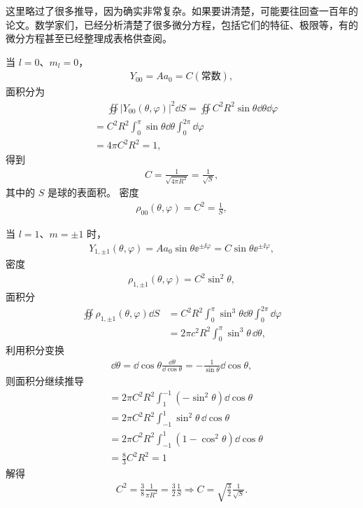 这里略过了很多推导，因为确实非常复杂。如果要讲清楚，可能要往回查一百年的论文。数学家们，已经分析清楚了很多微分方程，包括它们的特征、极限等，有的微分方程甚至已经整理成表格供查阅。

当 $l=0$、$m_l = 0$，
\begin{align}
    Y_{00} = A a_0 = C (\text{常数}),
\end{align}
面积分为
\begin{align}
    &\phantom{=}\oiint |Y_{00}(\theta, \varphi)|^2 \dd S 
    = \oiint C^2 R^2 \sin\theta \dd\theta \dd\varphi\\
    &= C^2 R^2 \int_0^\pi \sin\theta \dd\theta \int_0^{2\pi} \dd\varphi \\
    &= 4 \pi C^2 R^2 = 1, 
\end{align}
得到
\begin{align}
    C = \frac1{\sqrt{4\pi R^2}} = \frac1{\sqrt S},
\end{align}
其中的 $S$ 是球的表面积。
密度
\begin{align}
    \rho_{00}(\theta, \varphi) = C^2 = \frac1S,
\end{align}

当 $l=1$、$m=\pm1$ 时，
\begin{align}
    Y_{1,\pm1}(\theta, \varphi) = A a_0 \sin\theta \ee^{\pm\ii\varphi} = C \sin\theta \ee^{\pm\ii\varphi},
\end{align}
密度
\begin{align}
    \rho_{1,\pm1} (\theta, \varphi) = C^2 \sin^2\theta, 
\end{align}
面积分
\begin{align}
    \oiint \rho_{1,\pm1} (\theta, \varphi) \dd S 
    &= C^2 R^2 \int_0^\pi \sin^3\theta \dd\theta \int_0^{2\pi} \dd\varphi \\
    &= 2\pi c^2 R^2 \int_0^\pi \sin^3\theta \,\dd\theta,
\end{align}
利用积分变换
\begin{align}
    \dd\theta = \dd\cos\theta \frac{\dd\theta}{\dd\cos\theta} = -\frac{1}{\sin\theta} \dd\cos\theta,
\end{align}
则面积分继续推导
\begin{align}
    &= 2\pi C^2R^2 \int_1^{-1} (-\sin^2\theta)\dd\cos\theta \\
    &= 2\pi C^2R^2 \int_{-1}^{1} \sin^2\theta\,\dd\cos\theta \\
    &= 2\pi C^2 R^2 \int_{-1}^1 (1-\cos^2\theta) \dd\cos\theta\\
    &= \frac83 C^2R^2 = 1
\end{align}
解得
\begin{align}
    C^2 = \frac 38 \frac1{\pi R^2} = \frac 32 \frac1S \Rightarrow C = \sqrt{\frac32}\frac1{\sqrt S}. 
\end{align}

